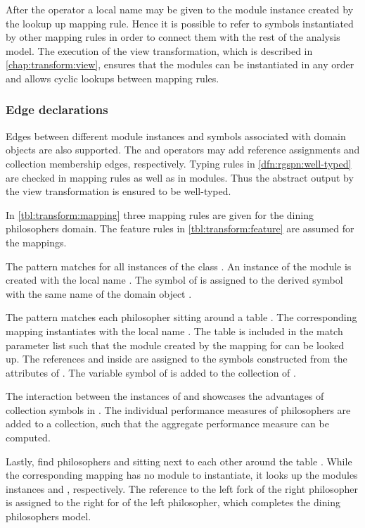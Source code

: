 After the operator \lit{=>} a local name may be given to the module instance created by the lookup up mapping rule. Hence it is possible to refer to symbols instantiated by other mapping rules in order to connect them with the rest of the analysis model. The execution of the view transformation, which is described in \vref{chap:transform:view}, ensures that the modules can be instantiated in any order and allows cyclic lookups between mapping rules.

\subsubsection{Edge declarations}

Edges between different  module instances and symbols associated with domain objects are also supported. The \lit{:=} and \lit{+=} operators may add reference assignments and collection membership edges, respectively. Typing rules in \vref{dfn:rgspn:well-typed} are checked in mapping rules as well as in  modules. Thus the abstract  output by the view transformation is ensured to be well-typed.

\begin{runningExample}
  In \vref{tbl:transform:mapping} three mapping rules are given for the dining philosophers domain. The feature rules in \vref{tbl:transform:feature} are assumed for the mappings.

  The pattern  matches for all instances  of the class . An instance of the module  is created with the local name . The symbol  of  is assigned to the derived symbol with the same name of the domain object .

  The pattern  matches each philosopher  sitting around a table . The corresponding mapping instantiates  with the local name . The table  is included in the match parameter list such that the module  created by the mapping  for  can be looked up. The references  and  inside  are assigned to the symbols constructed from the attributes of . The variable symbol  of  is added to the collection  of .

  The interaction between the instances of  and  showcases the advantages of collection symbols in . The individual performance measures  of philosophers are added to a collection, such that the aggregate performance measure  can be computed.

  Lastly,  find philosophers  and  sitting next to each other around the table . While the corresponding mapping has no  module to instantiate, it looks up the modules instances  and , respectively. The reference to the left fork of the right philosopher is assigned to the right for of the left philosopher, which completes the dining philosophers model.
\end{runningExample}

